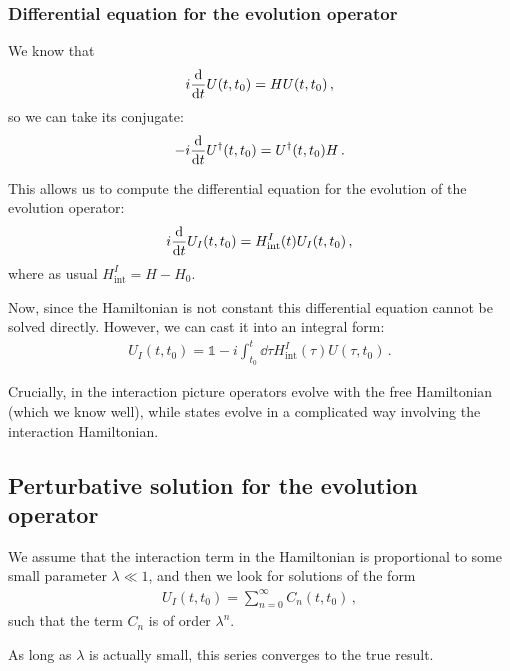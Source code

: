 \documentclass[main.tex]{subfiles}
\begin{document}
\subsubsection{Differential equation for the evolution operator}

We know that 
%
\begin{align}
i \dv{}{t} U (t, t_0 ) = H U (t, t_0 )
\,,
\end{align}
%
so we can take its conjugate: 
%
\begin{align}
- i \dv{}{t} U ^\dag (t, t_0 ) = U ^\dag (t, t_0 ) H 
\,.
\end{align}

This allows us to compute the differential equation for the evolution of the evolution operator: 
%
\begin{align}
i \dv{}{t} U_I (t, t_0 ) 
= H _{\text{int}}^{I} (t) U_I (t, t_0 )
\,,
\end{align}
%
where as usual \(H_{\text{int}}^{I} = H - H_0 \). 

Now, since the Hamiltonian is not constant this differential equation cannot be solved directly. However, we can cast it into an integral form: 
%
\begin{align} \label{eq:integral-expression-evolution-operator-interaction}
U_I (t, t_0 ) = \mathbb{1} - i \int_{t_0 }^{t} \dd{\tau }
H _{\text{int}}^{I} (\tau ) U(\tau , t_0 )
\,.
\end{align}

Crucially, in the interaction picture operators evolve with the free Hamiltonian (which we know well), while states evolve in a complicated way involving the interaction Hamiltonian. 

\subsection{Perturbative solution for the evolution operator}

We assume that the interaction term in the Hamiltonian is proportional to some small parameter \(\lambda \ll 1 \), and then we look for solutions of the form 
%
\begin{align}
U_I (t, t_0 ) = \sum _{n=0}^{\infty } C_n (t, t_0 )
\,,
\end{align}
%
such that the term \(C_n\) is of order \(\lambda^{n }\).

As long as \(\lambda \) is actually small, this series converges to the true result.
\end{document}
